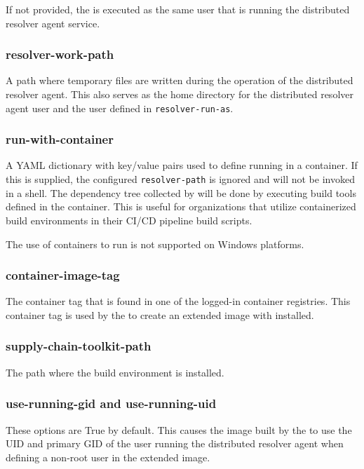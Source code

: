 If not provided, the \scaresolver is executed as the same user that is running the distributed resolver agent service.

\subsubsection{resolver-work-path}\label{sec:agent-resolver-work-path}
A path where temporary files are written during the operation of the distributed resolver agent.  This also serves as the home
directory for the distributed resolver agent user and the user defined in \texttt{resolver-run-as}.

\subsubsection{run-with-container}\label{sec:agent-run-with-container}
A YAML dictionary with key/value pairs used to define running \scaresolver in a container.  If this is supplied,
the configured \texttt{resolver-path} is ignored and \scaresolver will not be invoked in a shell.  The dependency
tree collected by \scaresolver will be done by executing build tools defined in the container.  This is useful for
organizations that utilize containerized build environments in their CI/CD pipeline build scripts.

The use of containers to run \scaresolver is not supported on Windows platforms.

\subsubsection{container-image-tag}\label{sec:agent-container-image-tag}
The container tag that is found in one of the logged-in container registries.  This container tag is used by the \toolkit
to create an extended image with \scaresolver installed.

\subsubsection{supply-chain-toolkit-path}\label{sec:agent-supply-chain-toolkit-path}
The path where the \toolkit build environment is installed.

\subsubsection{use-running-gid and use-running-uid}\label{sec:agent-use-running}
These options are True by default.  This causes the image built by the \toolkit to use the
UID and primary GID of the user running the distributed resolver agent when defining a non-root
user in the extended image.  


